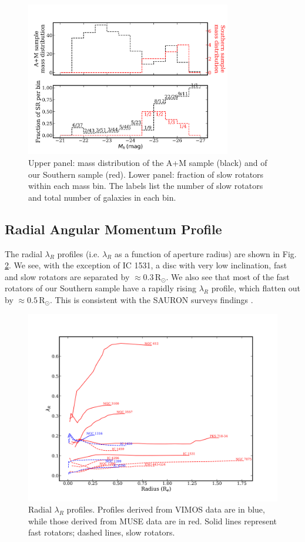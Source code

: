 			\begin{figure}
				\centering
				\includegraphics[width=0.8\textwidth]{chapter4/M_k_binned.png}
				\caption[Mass matching global kinematics]{Upper panel: mass distribution of the A+M sample (black) and of our Southern sample (red). Lower panel: fraction of slow rotators within each mass bin. The labels list the number of slow rotators and total number of galaxies in each bin.}
				\label{fig:SRmassFraction}
			\end{figure}

		\subsection{Radial Angular Momentum Profile}
			\label{subsec:ResolvedLambda_R}
			The radial $\lambda_R$ profiles (i.e. $\lambda_R$ as a function of aperture radius) are shown in Fig.\,\ref{fig:lambdaR_profile}. We see, with the exception of IC 1531, a disc with very low inclination, fast and slow rotators are separated by $\approx 0.3\,\mathrm{R_\odot}$. We also see that most of the fast rotators of our Southern sample have a rapidly rising $\lambda_R$ profile, which flatten out by $\approx 0.5\,\mathrm{R_\odot}$. This is consistent with the SAURON surveys findings \citep[e.g.][Fig.\,2]{Emsellem2007}. 

			\begin{figure}
				\centering
				\includegraphics[width=.7\textwidth]{chapter4/lambda_R.png}
				\caption[$\lambda_{R}$ radial profiles]{Radial $\lambda_{R}$ profiles. Profiles derived from VIMOS data are in blue, while those derived from MUSE data are in red. Solid lines represent fast rotators; dashed lines, slow rotators.}
				\label{fig:lambdaR_profile}
			\end{figure}

